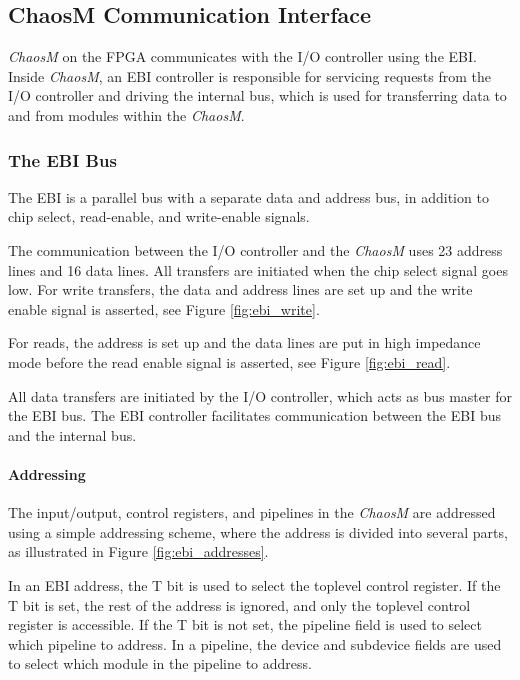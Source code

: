
\FloatBarrier
\subsection{ChaosM Communication Interface}\label{section:fpga-buses}

\textit{ChaosM} on the FPGA communicates with the I/O controller using the EBI. Inside \textit{ChaosM}, an EBI controller is responsible
for servicing requests from the I/O controller and driving the internal bus, which
is used for transferring data to and from modules within the \textit{ChaosM}.

\subsubsection{The EBI Bus}
The EBI\cite{efm_ebi} is a parallel bus with a separate data and address bus, in
addition to chip select, read-enable, and write-enable signals.

The communication between the I/O controller and the \textit{ChaosM} uses 23 address lines and 16 data
lines. All transfers are initiated when the chip select signal goes low. For
write transfers, the data and address lines are set up and the write enable
signal is asserted, see Figure \ref{fig:ebi_write}.

For reads, the address is set up and the data lines are put in high impedance mode
before the read enable signal is asserted, see Figure \ref{fig:ebi_read}.




All data transfers are initiated by the I/O controller, which acts as bus
master for the EBI bus. The EBI controller facilitates communication between
the EBI bus and the internal bus.

\FloatBarrier
\paragraph{Addressing}

The input/output, control registers, and pipelines in the \textit{ChaosM} are addressed
using a simple addressing scheme, where the address is divided into several
parts, as illustrated in Figure \ref{fig:ebi_addresses}.



In an EBI address, the T bit is used to select the toplevel control register.
If the T bit is set, the rest of the address is ignored, and only the toplevel
control register is accessible. If the T bit is not set, the pipeline field is
used to select which pipeline to address. In a pipeline, the device
and subdevice fields are used to select which module in the pipeline to address.

